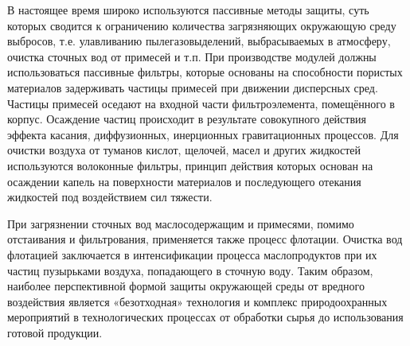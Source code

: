 В настоящее время широко используются пассивные методы защиты, суть которых сводится к ограничению количества
загрязняющих окружающую среду выбросов, т.е. улавливанию пылегазовыделений, выбрасываемых в атмосферу, очистка
сточных вод от примесей и т.п. При производстве модулей должны использоваться пассивные фильтры, которые основаны
на способности пористых материалов задерживать частицы примесей при движении дисперсных сред. Частицы примесей оседают
на входной части фильтроэлемента, помещённого в корпус. Осаждение частиц происходит в результате совокупного действия
эффекта касания, диффузионных, инерционных гравитационных процессов. Для очистки воздуха от туманов кислот, щелочей,
масел и других жидкостей используются волоконные фильтры, принцип действия которых основан на осаждении капель на
поверхности материалов и последующего отекания жидкостей под воздействием сил тяжести.

При загрязнении сточных вод маслосодержащим и примесями, помимо отстаивания и фильтрования, применяется также
процесс флотации. Очистка вод флотацией заключается в интенсификации процесса маслопродуктов при их частиц
пузырьками воздуха, попадающего в сточную воду. Таким образом, наиболее перспективной формой защиты окружающей
среды от вредного воздействия является «безотходная» технология и комплекс природоохранных мероприятий в
технологических процессах от обработки сырья до использования готовой продукции.

\newpage
